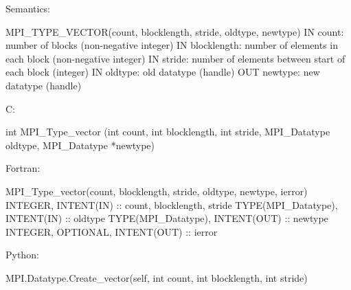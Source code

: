 Semantics:

MPI_TYPE_VECTOR(count, blocklength, stride, oldtype, newtype)
IN count: number of blocks (non-negative integer)
IN blocklength: number of elements in each block (non-negative integer)
IN stride: number of elements between start of each block (integer)
IN oldtype: old datatype (handle)
OUT newtype: new datatype (handle)

C:

int MPI_Type_vector
   (int count, int blocklength, int stride,
    MPI_Datatype oldtype, MPI_Datatype *newtype)

Fortran:

MPI_Type_vector(count, blocklength, stride, oldtype, newtype, ierror)
INTEGER, INTENT(IN) :: count, blocklength, stride
TYPE(MPI_Datatype), INTENT(IN) :: oldtype
TYPE(MPI_Datatype), INTENT(OUT) :: newtype
INTEGER, OPTIONAL, INTENT(OUT) :: ierror

Python:

MPI.Datatype.Create_vector(self, int count, int blocklength, int stride)
